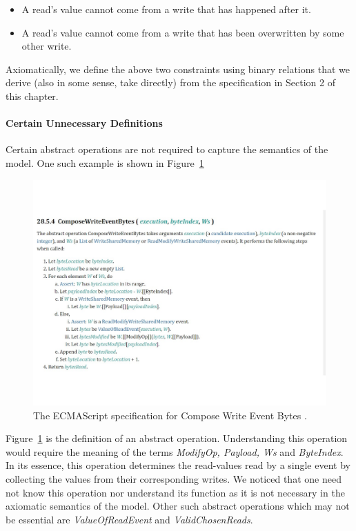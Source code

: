     \begin{itemize}
        \item A read's value cannot come from a write that has happened after it. 
        \item A read's value cannot come from a write that has been overwritten by some other write.  
    \end{itemize}
    Axiomatically, we define the above two constraints using binary relations that we derive (also in some sense, take directly) from the specification in Section 2 of this chapter. 
    
\paragraph{Certain Unnecessary Definitions}
    Certain abstract operations are not required to capture the semantics of the model. 
    One such example is shown in Figure~\ref{model:Std2}
    \begin{figure}[H]
        \centering 
        \includegraphics[scale=0.6]{3.ECMAScriptMemoryModel/ECMAScriptStd.pdf}
        \caption{The ECMAScript specification for Compose Write Event Bytes \cite{ECMA}.}
        \label{model:Std2}
    \end{figure}
    Figure~\ref{model:Std2} is the definition of an abstract operation. 
    Understanding this operation would require the meaning of the terms \textit{ModifyOp, Payload, Ws} and \textit{ByteIndex}. 
    In its essence, this operation determines the read-values read by a single event by collecting the values from their corresponding writes. 
    We noticed that one need not know this operation nor understand its function as it is not necessary in the axiomatic semantics of the model. 
    Other such abstract operations which may not be essential are \textit{ValueOfReadEvent} and \textit{ValidChosenReads}\cite{ECMA}. 

